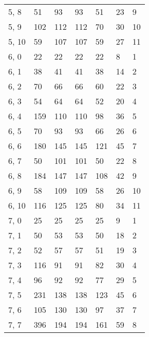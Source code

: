 \begin{table}
\begin{tabular}{lllllll}
5, 8   &         51 &          93 &        93 &          51 &       23 &     9 \\
5, 9   &        102 &         112 &       112 &          70 &       30 &    10 \\
5, 10  &         59 &         107 &       107 &          59 &       27 &    11 \\
6, 0   &         22 &          22 &        22 &          22 &        8 &     1 \\
6, 1   &         38 &          41 &        41 &          38 &       14 &     2 \\
6, 2   &         70 &          66 &        66 &          60 &       22 &     3 \\
6, 3   &         54 &          64 &        64 &          52 &       20 &     4 \\
6, 4   &        159 &         110 &       110 &          98 &       36 &     5 \\
6, 5   &         70 &          93 &        93 &          66 &       26 &     6 \\
6, 6   &        180 &         145 &       145 &         121 &       45 &     7 \\
6, 7   &         50 &         101 &       101 &          50 &       22 &     8 \\
6, 8   &        184 &         147 &       147 &         108 &       42 &     9 \\
6, 9   &         58 &         109 &       109 &          58 &       26 &    10 \\
6, 10  &        116 &         125 &       125 &          80 &       34 &    11 \\
7, 0   &         25 &          25 &        25 &          25 &        9 &     1 \\
7, 1   &         50 &          53 &        53 &          50 &       18 &     2 \\
7, 2   &         52 &          57 &        57 &          51 &       19 &     3 \\
7, 3   &        116 &          91 &        91 &          82 &       30 &     4 \\
7, 4   &         96 &          92 &        92 &          77 &       29 &     5 \\
7, 5   &        231 &         138 &       138 &         123 &       45 &     6 \\
7, 6   &        105 &         130 &       130 &          97 &       37 &     7 \\
7, 7   &        396 &         194 &       194 &         161 &       59 &     8 \\

\end{tabular}
\end{table}
